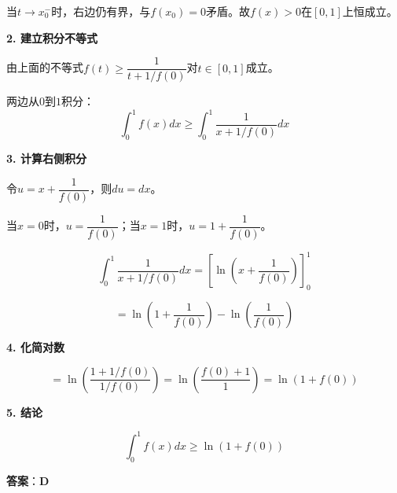 \documentclass[standard]{ExBook}
\begin{document}
\begin{qitems}
\begin{bbox}
\begin{solution}
            当$t \to x_0^-$时，右边仍有界，与$f(x_0)=0$矛盾。故$f(x)>0$在$[0,1]$上恒成立。
            
            \textbf{2. 建立积分不等式}
            
            由上面的不等式$f(t) \ge \dfrac{1}{t+1/f(0)}$对$t \in [0, 1]$成立。
            
            两边从$0$到$1$积分：
            $$\int_0^1 f(x)dx \ge \int_0^1 \frac{1}{x+1/f(0)} dx$$
            
            \textbf{3. 计算右侧积分}
            
            令$u = x+\dfrac{1}{f(0)}$，则$du = dx$。
            
            当$x=0$时，$u = \dfrac{1}{f(0)}$；当$x=1$时，$u = 1+\dfrac{1}{f(0)}$。
            
            $$\int_0^1 \frac{1}{x+1/f(0)} dx = \left[\ln\left(x+\frac{1}{f(0)}\right)\right]_0^1$$
            
            $$= \ln\left(1+\frac{1}{f(0)}\right) - \ln\left(\frac{1}{f(0)}\right)$$
            
            \textbf{4. 化简对数}
            
            $$= \ln\left(\frac{1+1/f(0)}{1/f(0)}\right) = \ln\left(\frac{f(0)+1}{1}\right) = \ln(1+f(0))$$
            
            \textbf{5. 结论}
            
            $$\int_0^1 f(x)dx \ge \ln(1+f(0))$$
            
            \textbf{答案}：\textbf{D}
        \end{solution}
    \end{bbox}


\end{qitems}
\end{document}
